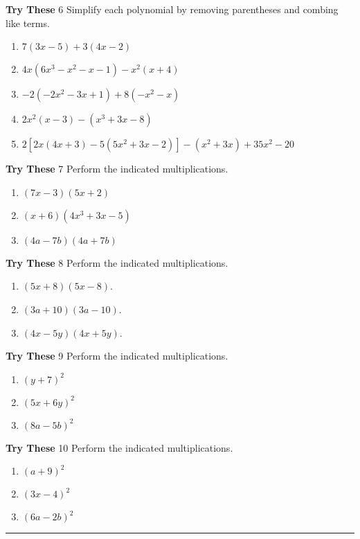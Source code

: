 \documentclass[a4paper]{JAC2003}
\begin{document}
\noindent\textcolor{red!75!black}{\textbf{Try These}} 6 Simplify each polynomial by removing parentheses and combing like terms.
\begin{enumerate}
\item $7(3 x-5)+3(4 x-2)$

\item $4 x\left(6 x^{3}-x^{2}-x-1\right)-x^{2}(x+4)$

\item $-2\left(-2 x^{2}-3 x+1\right)+8\left(-x^{2}-x\right)$

\item $2 x^{2}(x-3)-\left(x^{3}+3 x-8\right)$

\item $2\left[2 x(4 x+3)-5\left(5 x^{2}+3 x-2\right)\right]-\left(x^{2}+3 x\right)+35 x^{2}-20$
\end{enumerate}


\noindent\textcolor{red!75!black}{\textbf{Try These}} 7 Perform the indicated multiplications.
\begin{enumerate}
\item $(7 x-3)(5 x+2)$

\item $(x+6)\left(4 x^{3}+3 x-5\right)$

\item $(4 a-7 b)(4 a+7 b)$
\end{enumerate}

\noindent\textcolor{red!75!black}{\textbf{Try These}} 8 Perform the indicated multiplications.
\begin{enumerate}
\item $(5 x+8)(5 x-8)$.

\item $(3 a+10)(3 a-10)$.

\item $(4 x-5 y)(4 x+5 y)$.
\end{enumerate}

\noindent\textcolor{red!75!black}{\textbf{Try These}} 9 Perform the indicated multiplications.
\begin{enumerate}
\item $(y+7)^{2}$

\item $(5 x+6 y)^{2}$

\item $(8 a-5 b)^{2}$
\end{enumerate}

\noindent\textcolor{red!75!black}{\textbf{Try These}} 10 Perform the indicated multiplications.
\begin{enumerate}
\item $(a+9)^{2}$

\item $(3 x-4)^{2}$

\item $(6 a-2 b)^{2}$
\end{enumerate}
\noindent\rule[0.5ex]{\linewidth}{1pt}
\end{document}

